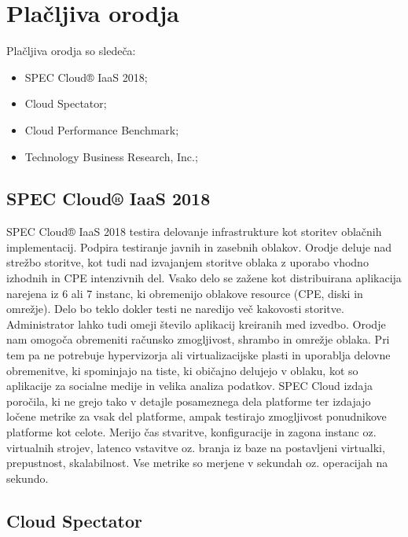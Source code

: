 \section{Plačljiva orodja}
Plačljiva orodja so sledeča:
\begin{itemize}
\item SPEC Cloud® IaaS 2018;
\item Cloud Spectator;
\item Cloud Performance Benchmark;
\item Technology Business Research, Inc.;
\end{itemize}

\subsection{SPEC Cloud® IaaS 2018}

\cite{SPEC} SPEC Cloud® IaaS 2018 testira delovanje infrastrukture kot storitev oblačnih implementacij. Podpira testiranje javnih in zasebnih oblakov. Orodje deluje nad strežbo storitve, kot tudi nad izvajanjem storitve oblaka z uporabo vhodno izhodnih in CPE intenzivnih del. Vsako delo se zažene kot distribuirana aplikacija narejena iz 6 ali 7 instanc, ki obremenijo oblakove resource (CPE, diski in omrežje). Delo bo teklo dokler testi ne naredijo več kakovosti storitve. Administrator lahko tudi omeji število aplikacij kreiranih med izvedbo.
Orodje nam omogoča obremeniti računsko zmogljivost, shrambo in omrežje oblaka. Pri tem pa ne potrebuje hypervizorja ali virtualizacijske plasti in uporablja delovne obremenitve, ki spominjajo na tiste, ki običajno delujejo v oblaku, kot so aplikacije za socialne medije in velika analiza podatkov.
SPEC Cloud izdaja poročila, ki ne grejo tako v detajle posameznega dela platforme ter izdajajo ločene metrike za vsak del platforme, ampak testirajo zmogljivost ponudnikove platforme kot celote. Merijo čas stvaritve, konfiguracije in zagona instanc oz. virtualnih strojev, latenco vstavitve oz. branja iz baze na postavljeni virtualki, prepustnost, skalabilnost. Vse metrike so merjene v sekundah oz. operacijah na sekundo.

\subsection{Cloud Spectator}

